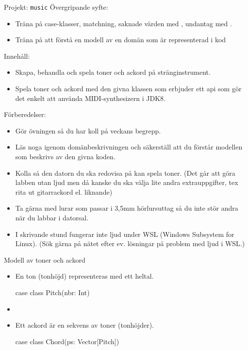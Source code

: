 
\begin{Slide}{Projekt: \texttt{music}}\SlideFontSmall
Övergripande syfte:
\begin{itemize}
\item Träna på case-klasser, matchning, saknade värden med , undantag med .
\item Träna på att förstå en modell av en domän som är representerad i kod
\end{itemize}

Innehåll:
\begin{itemize}
\item Skapa, behandla och spela toner och ackord på stränginstrument.
\item Spela toner och ackord med den givna klassen  som erbjuder ett api som gör det enkelt att använda MIDI-synthesizern i JDK8.
\end{itemize}

Förberedelser:
\begin{itemize}
  \item Gör övningen så du har koll på veckans begrepp.
  \item Läs noga igenom domänbeskrivningen och säkerställ att du förstår modellen som beskrivs av den givna koden.
  \item Kolla så den datorn du ska redovisa på kan spela toner. (Det går att göra labben utan ljud men då kanske du ska välja lite andra extrauppgifter, tex rita ut gitarrackord el. liknande)
  \item Ta gärna med lurar som passar i 3,5mm hörlursuttag så du inte stör andra när du labbar i datorsal.
  \item I skrivande stund fungerar inte ljud under WSL (Windows Subsystem for Linux). (Sök gärna på nätet efter ev. lösningar på problem med ljud i WSL.)
\end{itemize}

\end{Slide}


\begin{Slide}{Modell av toner och ackord}

\begin{itemize}
\item En ton (tonhöjd) representeras med ett heltal.
\begin{Code}
case class Pitch(nbr: Int)
\end{Code}

\item[]

\item Ett ackord är en sekvens av toner (tonhöjder).
\begin{Code}
case class Chord(ps: Vector[Pitch])
\end{Code}
\end{itemize}

\end{Slide}


